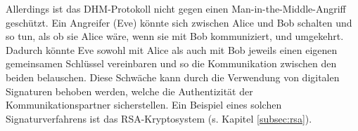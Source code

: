 Allerdings ist das DHM-Protokoll nicht gegen einen Man-in-the-Middle-Angriff geschützt. Ein Angreifer (Eve) könnte sich zwischen Alice und Bob schalten und so tun, als ob sie Alice wäre, wenn sie mit Bob kommuniziert, und umgekehrt. Dadurch könnte Eve sowohl mit Alice als auch mit Bob jeweils einen eigenen gemeinsamen Schlüssel vereinbaren und so die Kommunikation zwischen den beiden belauschen. Diese Schwäche kann durch die Verwendung von digitalen Signaturen behoben werden, welche die Authentizität der Kommunikationspartner sicherstellen. Ein Beispiel eines solchen Signaturverfahrens ist das \gls{RSA}-Kryptosystem (s. Kapitel \cref{subsec:rsa}).
